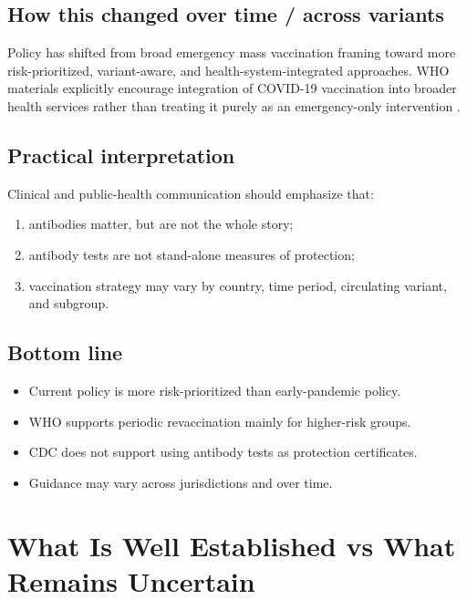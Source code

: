 \documentclass[12pt]{article}
\begin{document}
\subsection*{How this changed over time / across variants}
Policy has shifted from broad emergency mass vaccination framing toward more risk-prioritized, variant-aware, and health-system-integrated approaches. WHO materials explicitly encourage integration of COVID-19 vaccination into broader health services rather than treating it purely as an emergency-only intervention \cite{ref9,ref10}.

\subsection*{Practical interpretation}
Clinical and public-health communication should emphasize that:
\begin{enumerate}[leftmargin=1.5em]
    \item antibodies matter, but are not the whole story;
    \item antibody tests are not stand-alone measures of protection;
    \item vaccination strategy may vary by country, time period, circulating variant, and subgroup.
\end{enumerate}

\subsection*{Bottom line}
\begin{itemize}[leftmargin=1.5em]
    \item Current policy is more risk-prioritized than early-pandemic policy.
    \item WHO supports periodic revaccination mainly for higher-risk groups.
    \item CDC does not support using antibody tests as protection certificates.
    \item Guidance may vary across jurisdictions and over time.
\end{itemize}

\section{What Is Well Established vs What Remains Uncertain}
\end{document}
